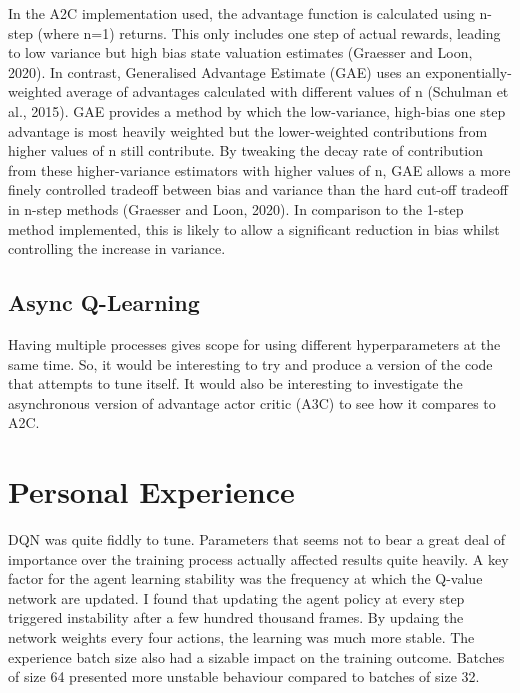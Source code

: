 \documentclass{article}
\begin{document}
In the A2C implementation used, the advantage function is calculated using n-step (where n=1) returns. This only includes one step of actual rewards, leading to low variance but high bias state valuation estimates (Graesser and Loon, 2020).
In contrast, Generalised Advantage Estimate (GAE) uses an exponentially-weighted average of advantages calculated with different values of n (Schulman et al., 2015). GAE provides a method by which the low-variance, high-bias one step advantage is most heavily weighted but the lower-weighted contributions from higher values of n still contribute. By tweaking the decay rate of contribution from these higher-variance estimators with higher values of n, GAE allows a more finely controlled tradeoff between bias and variance than the hard cut-off tradeoff in n-step methods (Graesser and Loon, 2020). In comparison to the 1-step method implemented, this is likely to allow a significant reduction in bias whilst controlling the increase in variance.

\subsection{Async Q-Learning}

Having multiple processes gives scope for using different hyperparameters at the same time. So, it would be interesting to try and produce a version of the code that attempts to tune itself.
It would also be interesting to investigate the asynchronous version of advantage actor critic (A3C) to see how it compares to A2C.

\section{Personal Experience}

DQN was quite fiddly to tune. Parameters that seems not to bear a great deal of importance over the training process actually affected results quite heavily. A key factor for the agent learning stability was the frequency at which the Q-value network are updated. I found that updating the agent policy at every step triggered instability after a few hundred thousand frames. By updaing the network weights every four actions, the learning was much more stable. The experience batch size also had a sizable impact on the training outcome. Batches of size 64 presented more unstable behaviour compared to batches of size 32.  
\end{document}
